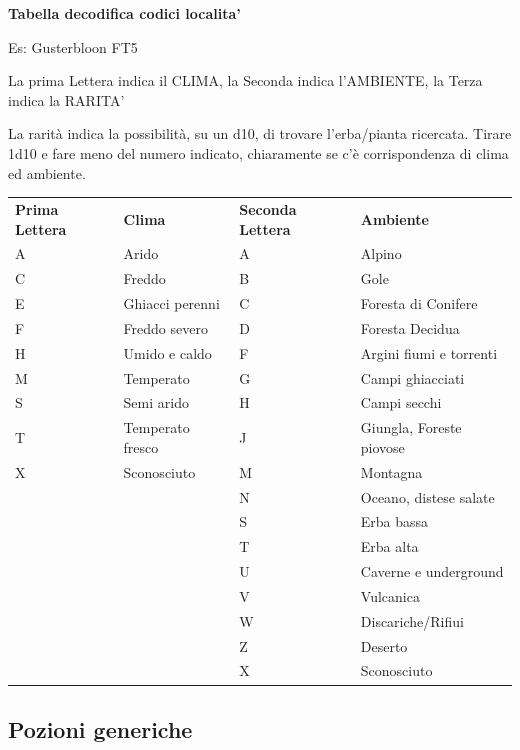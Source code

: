 \documentclass[a4paper,11pt,twoside,openany]{book}
\begin{document}
\bigskip

\textbf{Tabella decodifica codici localita'}
\smallskip

Es: Gusterbloon FT5

La prima Lettera indica il CLIMA, la Seconda indica l'AMBIENTE, la
Terza indica la RARITA'

La rarità indica la possibilità, su un d10, di trovare l'erba/pianta
ricercata. Tirare 1d10 e fare meno del numero indicato, chiaramente
se c'è corrispondenza di clima ed ambiente.
\bigskip

\begin{tabularx}{0.95\textwidth}{XXXX}
	\toprule
	\textbf{Prima Lettera} & \textbf{Clima}   & \textbf{Seconda Lettera} & \textbf{Ambiente}\\
	A       & Arido 			 & A         & Alpino\\
	C       & Freddo			 & B         & Gole\\
	E       & Ghiacci perenni	 & C         & Foresta di Conifere\\
	F       & Freddo severo   	 & D         & Foresta Decidua\\
	H       & Umido e caldo  	 & F         & Argini fiumi e torrenti\\
	M       & Temperato          & G         & Campi ghiacciati\\
	S       & Semi arido         & H         & Campi secchi\\
	T       & Temperato fresco   & J         & Giungla, Foreste piovose\\
	X       & Sconosciuto        & M         & Montagna\\
	        &                    & N         & Oceano, distese salate\\
	        &                    & S         & Erba bassa\\
	        &                    & T         & Erba alta\\
	        &                    & U         & Caverne e underground\\
	        &                    & V         & Vulcanica\\
 	        &                    & W         & Discariche/Rifiui\\
	        &                    & Z         & Deserto\\
 	        &                    & X         & Sconosciuto\\
\end{tabularx}

\subsection{Pozioni generiche}
\end{document}
